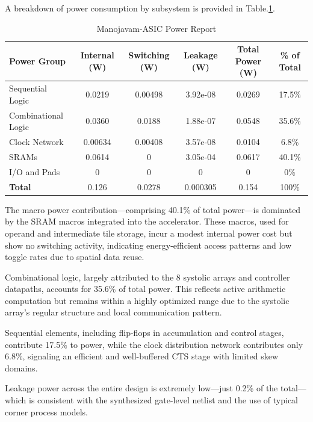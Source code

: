 A breakdown of power consumption by subsystem is provided in Table.\ref{tab:manojavam-asic-power-report}.
\begin{table}
	\centering
	\fontsize{10}{12}\selectfont
	\caption{Manojavam-ASIC Power Report}
	\label{tab:manojavam-asic-power-report}
	\begin{tabular}{|p{3cm}|c|c|c|c|c|}
		\hline
		\textbf{Power Group} & \textbf {Internal (W)} & \textbf {Switching (W)} & \textbf {Leakage (W)} & \textbf {Total Power (W)} & \textbf {\% of Total}\\
		\hline
		Sequential Logic & 0.0219 & 0.00498 & 3.92e-08 & 0.0269 & 17.5\%\\\hline
		Combinational Logic & 0.0360 & 0.0188 & 1.88e-07 & 0.0548 & 35.6\%\\\hline
		Clock Network & 0.00634 & 0.00408 & 3.57e-08 & 0.0104 & 6.8\%\\\hline
		SRAMs & 0.0614 & 0 & 3.05e-04 & 0.0617 & 40.1\%\\\hline
		I/O and Pads & 0 & 0 & 0 & 0 & 0\%\\\hline
		\textbf{Total} & 0.126 & 0.0278 & 0.000305 & 0.154 & 100\%\\\hline
	\end{tabular}
\end{table}

The macro power contribution—comprising 40.1\% of total power—is dominated by the SRAM macros integrated into the accelerator. These macros, used for operand and intermediate tile storage, incur a modest internal power cost but show no switching activity, indicating energy-efficient access patterns and low toggle rates due to spatial data reuse.

Combinational logic, largely attributed to the 8 systolic arrays and controller datapaths, accounts for 35.6\% of total power. This reflects active arithmetic computation but remains within a highly optimized range due to the systolic array's regular structure and local communication pattern.

Sequential elements, including flip-flops in accumulation and control stages, contribute 17.5\% to power, while the clock distribution network contributes only 6.8\%, signaling an efficient and well-buffered CTS stage with limited skew domains.

Leakage power across the entire design is extremely low—just 0.2\% of the total—which is consistent with the synthesized gate-level netlist and the use of typical corner process models.

